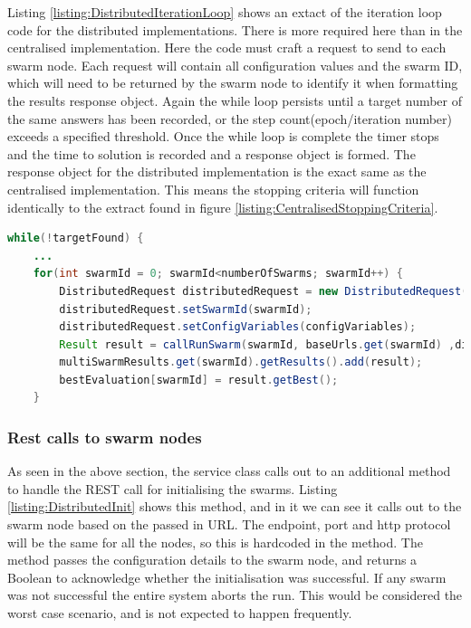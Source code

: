 \documentclass[oneside,12pt]{book}
\begin{document}
Listing \ref{listing:DistributedIterationLoop} shows an extact of the iteration loop code for the distributed implementations. There is more required here than in the centralised implementation. Here the code must craft a request to send to each swarm node. Each request will contain all configuration values and the swarm ID, which will need to be returned by the swarm node to identify it when formatting the results response object. Again the while loop persists until a target number of the same answers has been recorded, or the step count(epoch/iteration number) exceeds a specified threshold. Once the while loop is complete the timer stops and the time to solution is recorded and a response object is formed. The response object for the distributed implementation is the exact same as the centralised implementation. This means the stopping criteria will function identically to the extract found in figure \ref{listing:CentralisedStoppingCriteria}.

\begin{lstlisting}[basicstyle=\footnotesize, language=Java]
while(!targetFound) {
    ...
    for(int swarmId = 0; swarmId<numberOfSwarms; swarmId++) {
        DistributedRequest distributedRequest = new DistributedRequest();
        distributedRequest.setSwarmId(swarmId);
        distributedRequest.setConfigVariables(configVariables);
        Result result = callRunSwarm(swarmId, baseUrls.get(swarmId) ,distributedRequest);
        multiSwarmResults.get(swarmId).getResults().add(result);
        bestEvaluation[swarmId] = result.getBest();
    }
\end{lstlisting}
\label{listing:DistributedIterationLoop}

\subsubsection{Rest calls to swarm nodes}
As seen in the above section, the service class calls out to an additional method to handle the REST call for initialising the swarms. Listing \ref{listing:DistributedInit} shows this method, and in it we can see it calls out to the swarm node based on the passed in URL. The endpoint, port and http protocol will be the same for all the nodes, so this is hardcoded in the method. The method passes the configuration details to the swarm node, and returns a Boolean to acknowledge whether the initialisation was successful. If any swarm was not successful the entire system aborts the run. This would be considered the worst case scenario, and is not expected to happen frequently. 
\end{document}
